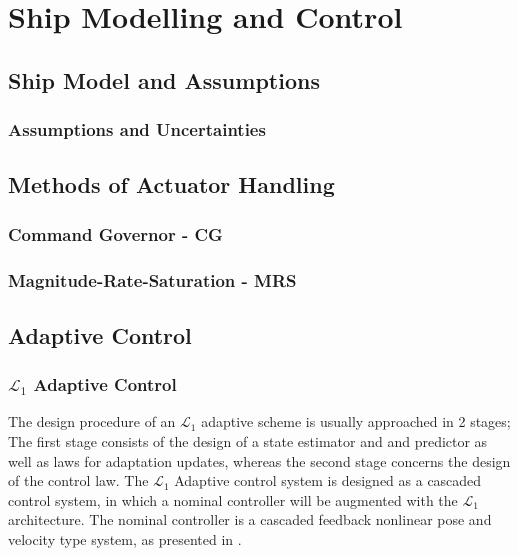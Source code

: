 
\chapter{Ship Modelling and Control}
\section{Ship Model and Assumptions}


\subsection{Assumptions and Uncertainties}



\section{Methods of Actuator Handling}

\subsection{Command Governor - CG}

\subsection{Magnitude-Rate-Saturation - MRS}

\section{Adaptive Control}


\subsection{$\mathcal{L}_1$ Adaptive Control}

The design procedure of an $\mathcal{L}_1$ adaptive scheme is usually approached in 2 stages; The first stage consists of the design of a state estimator and and predictor as well as laws for adaptation updates, whereas the second stage concerns the design of the control law. The $\mathcal{L}_1$ Adaptive control system is designed as a cascaded control system, in which a nominal controller will be augmented with the $\mathcal{L}_1$ architecture. The nominal controller is a cascaded feedback nonlinear pose and velocity type system, as presented in \cite{Sørensen2016}.

